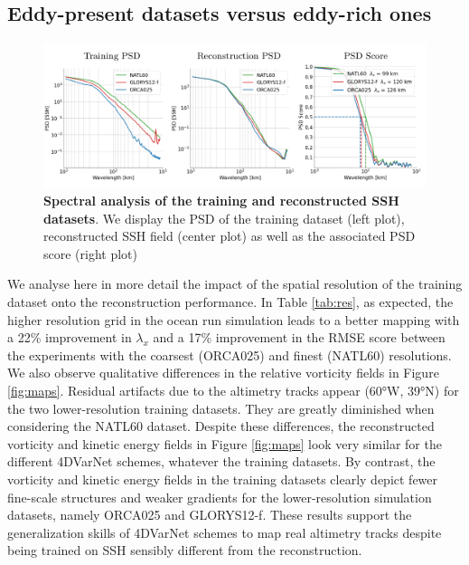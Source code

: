 \begin{bibunit}
\subsection{Eddy-present datasets versus eddy-rich ones}
\label{ssec:resolution}


\begin{figure}[H]
\small
\includegraphics[width=\linewidth]{./00_Simulearning/standalone_figures/psd_res.png}
\caption{
\textbf{Spectral analysis of the training and reconstructed SSH datasets}. We display the PSD of the training dataset (left plot), reconstructed SSH field (center plot) as well as the associated PSD score (right plot)}\vspace{-5mm}
\label{fig:respsd}
\end{figure}


We analyse here in more detail the impact of the spatial resolution of the training dataset onto the reconstruction performance. In Table \ref{tab:res}, as expected, the higher resolution grid in the ocean run simulation leads to a better mapping with a 22\% improvement in $\lambda_x$  and a 17\% improvement in the RMSE score between the experiments with the coarsest (ORCA025) and finest (NATL60) resolutions.
We also observe qualitative differences in the relative vorticity fields in Figure \ref{fig:maps}.  Residual artifacts due to the altimetry tracks appear (60°W, 39°N) for the two lower-resolution training datasets. They are greatly diminished when considering the NATL60 dataset. 
Despite these differences, the reconstructed vorticity and kinetic energy fields in Figure \ref{fig:maps} look very similar for the different 4DVarNet schemes, whatever the training datasets. By contrast, the vorticity and kinetic energy fields in the training datasets clearly depict fewer fine-scale structures and weaker gradients for the lower-resolution simulation datasets, namely ORCA025 and GLORYS12-f.
These results support the generalization skills of 4DVarNet schemes to map real altimetry tracks despite being trained on SSH sensibly different from the reconstruction. 


\end{bibunit}

